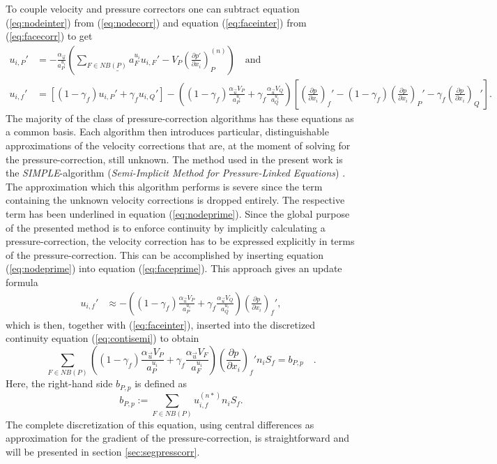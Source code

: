 To couple velocity and pressure correctors one can subtract equation (\ref{eq:nodeinter}) from (\ref{eq:nodecorr}) and equation (\ref{eq:faceinter}) from (\ref{eq:facecorr}) to get
\begin{align}
  \label{eq:nodeprime}
  u_{i,P}' 
  &=  
  - \frac{\alpha_{\vec{u}}}{a_P^{u_i}} \left(\underline{\sum_{F \in NB(P)} a_F^{u_i} u_{i,F}'}
  - V_P\left(\frac{\partial p'}{\partial x_i}\right)_P^{(n)} \right) \quad \text{and}\\[1em]
  \label{eq:faceprime}
  u_{i,f}' 
  &= 
  \left[\left(1 - \gamma_f\right) u_{i,P}' + \gamma_f u_{i,Q}' \right] 
  - 
  \left(\left(1 - \gamma_f\right) \frac{\alpha_\vec{u} V_P}{a_P^{u_i}} + \gamma_f \frac{\alpha_\vec{u} V_Q}{a_Q^{u_i}}\right)
  \left[ 
  \left(\frac{\partial p}{\partial x_i}\right)_f' 
  - \left( 1 - \gamma_f \right) \left( \frac{\partial p}{\partial x_i} \right)_P' 
  - \gamma_f \left(\frac{\partial p}{\partial x_i}\right)_Q' 
  \right].
\end{align}
The majority of the class of pressure-correction algorithms has these equations as a common basis. Each algorithm then introduces particular, distinguishable approximations of the velocity corrections that are, at the moment of solving for the pressure-correction, still unknown. The method used in the present work is the \emph{SIMPLE}-algorithm (\emph{Semi-Implicit Method for Pressure-Linked Equations}) \cite{patankar72}. The approximation which this algorithm performs is severe since the term containing the unknown velocity corrections is dropped entirely. The respective term has been underlined in equation (\ref{eq:nodeprime}). Since the global purpose of the presented method is to enforce continuity by implicitly calculating a pressure-correction, the velocity correction has to be expressed explicitly in terms of the pressure-correction. This can be accomplished by inserting equation (\ref{eq:nodeprime}) into equation (\ref{eq:faceprime}). This approach gives an update formula
\begin{align}
  \label{eq:velcorr}
  u_{i,f}' 
  &\approx 
  - \left(\left(1 - \gamma_f\right) \frac{\alpha_\vec{u} V_P}{a_P^{u_i}} + \gamma_f \frac{\alpha_\vec{u} V_Q}{a_Q^{u_i}}\right)
  \left(\frac{\partial p}{\partial x_i}\right)_f',
\end{align}
which is then, together with (\ref{eq:faceinter}), inserted into the discretized continuity equation (\ref{eq:contisemi}) to obtain
\begin{equation}
  \label{eq:presscorr}
  \sum_{F \in NB(P)} \left(\left(1 - \gamma_f\right) \frac{\alpha_\vec{u} V_P}{a_P^{u_i}} + \gamma_f \frac{\alpha_\vec{u} V_F}{a_F^{u_i}}\right)
  \left(\frac{\partial p}{\partial x_i}\right)_f' n_i S_f
  = b_{P,p}
  \quad.
\end{equation}
Here, the right-hand side \(b_{P,p}\) is defined as
\begin{equation}
  \label{eq:presscorrb}
  b_{P,p} := \sum_{F \in NB(P)} u_{i,f}^{(n*)} n_i S_f.
\end{equation}
The complete discretization of this equation, using central differences as approximation for the gradient of the pressure-correction, is straightforward and will be presented in section \ref{sec:segpresscorr}.

